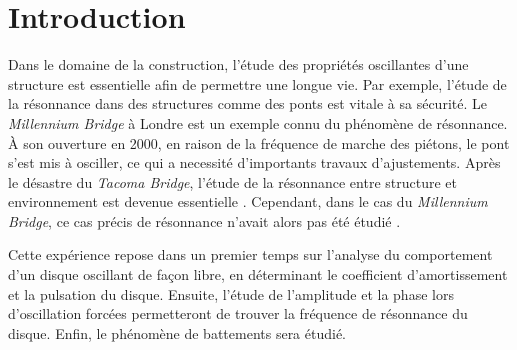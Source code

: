 \section{Introduction}

Dans le domaine de la construction, l'étude des propriétés oscillantes d'une structure est essentielle afin de permettre une longue vie. Par exemple, l'étude de la résonnance dans des structures comme des ponts est vitale à sa sécurité. Le \textit{Millennium Bridge} à Londre est un exemple connu du phénomène de résonnance. À son ouverture en 2000, en raison de la fréquence de marche des piétons, le pont s'est mis à osciller, ce qui a necessité d'importants travaux d'ajustements. Après le désastre du \textit{Tacoma Bridge}, l'étude de la résonnance entre structure et environnement est devenue essentielle \cite{autre-pont-foireux}. Cependant, dans le cas du \textit{Millennium Bridge}, ce cas précis de résonnance n'avait alors pas été étudié \cite{pont-foireux}.

Cette expérience repose dans un premier temps sur l'analyse du comportement d'un disque oscillant de façon libre, en déterminant le coefficient d'amortissement et la pulsation du disque. Ensuite, l'étude de l'amplitude et la phase lors d'oscillation forcées permetteront de trouver la fréquence de résonnance du disque. Enfin, le phénomène de battements sera étudié.
